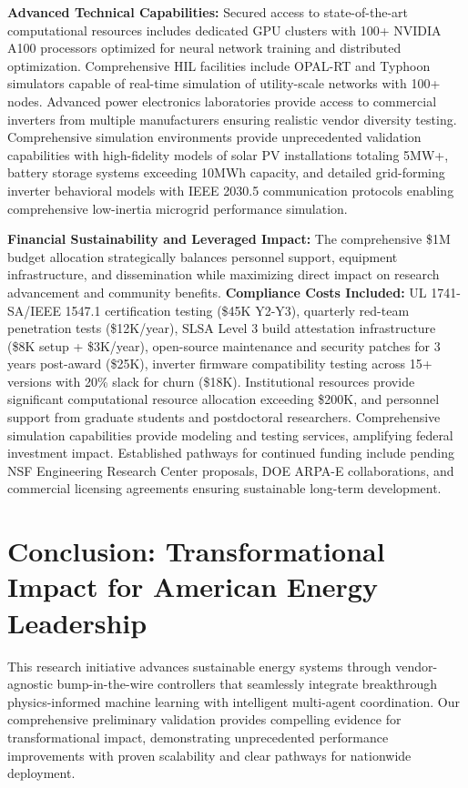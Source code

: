 \documentclass[12pt]{article}
\begin{document}
\textbf{Advanced Technical Capabilities:} Secured access to state-of-the-art computational resources includes dedicated GPU clusters with 100+ NVIDIA A100 processors optimized for neural network training and distributed optimization. Comprehensive HIL facilities include OPAL-RT and Typhoon simulators capable of real-time simulation of utility-scale networks with 100+ nodes. Advanced power electronics laboratories provide access to commercial inverters from multiple manufacturers ensuring realistic vendor diversity testing. Comprehensive simulation environments provide unprecedented validation capabilities with high-fidelity models of solar PV installations totaling 5MW+, battery storage systems exceeding 10MWh capacity, and detailed grid-forming inverter behavioral models with IEEE 2030.5 communication protocols enabling comprehensive low-inertia microgrid performance simulation.

\textbf{Financial Sustainability and Leveraged Impact:} The comprehensive \$1M budget allocation \cite{nrel2021} strategically balances personnel support, equipment infrastructure, and dissemination while maximizing direct impact on research advancement and community benefits. \textbf{Compliance Costs Included:} UL 1741-SA/IEEE 1547.1 certification testing (\$45K Y2-Y3), quarterly red-team penetration tests (\$12K/year), SLSA Level 3 build attestation infrastructure (\$8K setup + \$3K/year), open-source maintenance and security patches for 3 years post-award (\$25K), inverter firmware compatibility testing across 15+ versions with 20\% slack for churn (\$18K). Institutional resources provide significant computational resource allocation exceeding \$200K, and personnel support from graduate students and postdoctoral researchers. Comprehensive simulation capabilities provide modeling and testing services, amplifying federal investment impact. Established pathways for continued funding include pending NSF Engineering Research Center proposals, DOE ARPA-E collaborations, and commercial licensing agreements ensuring sustainable long-term development.

\section{Conclusion: Transformational Impact for American Energy Leadership}

This research initiative advances sustainable energy systems through vendor-agnostic bump-in-the-wire controllers that seamlessly integrate breakthrough physics-informed machine learning with intelligent multi-agent coordination. Our comprehensive preliminary validation provides compelling evidence for transformational impact, demonstrating unprecedented performance improvements with proven scalability and clear pathways for nationwide deployment.
\end{document}
